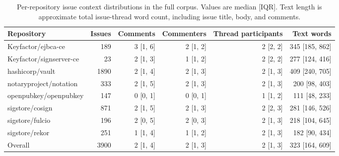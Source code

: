 \begin{table}[t]
\centering
\caption{Per-repository issue context distributions in the full corpus. Values are median [IQR]. Text length is approximate total issue-thread word count, including issue title, body, and comments.}
\label{tab:issue-context-distributions-by-repo}
\scriptsize
\begin{tabular}{lrrrrr}
\hline
Repository & Issues & Comments & Commenters & Thread participants & Text words \\
\hline
Keyfactor/ejbca-ce & 189 & 3 [1, 6] & 2 [1, 2] & 2 [2, 2] & 345 [185, 862] \\
Keyfactor/signserver-ce & 23 & 2 [1, 3] & 1 [1, 2] & 2 [2, 2] & 277 [124, 416] \\
hashicorp/vault & 1890 & 2 [1, 4] & 2 [1, 3] & 2 [1, 3] & 409 [240, 705] \\
notaryproject/notation & 333 & 2 [1, 5] & 2 [1, 3] & 2 [1, 3] & 200 [98, 403] \\
openpubkey/openpubkey & 147 & 0 [0, 1] & 0 [0, 1] & 1 [1, 2] & 111 [48, 233] \\
sigstore/cosign & 871 & 2 [1, 5] & 2 [1, 3] & 2 [2, 3] & 281 [146, 526] \\
sigstore/fulcio & 196 & 2 [0, 5] & 2 [0, 3] & 2 [1, 3] & 218 [104, 645] \\
sigstore/rekor & 251 & 1 [1, 4] & 1 [1, 2] & 2 [1, 3] & 182 [90, 434] \\
Overall & 3900 & 2 [1, 4] & 2 [1, 3] & 2 [1, 3] & 323 [164, 609] \\
\hline
\end{tabular}
\end{table}